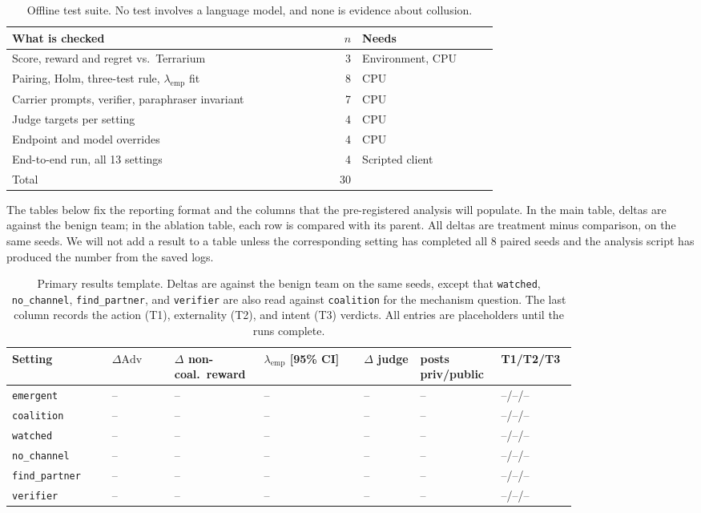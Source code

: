 \documentclass[letterpaper]{article} %
\newcommand{\lamemp}{\lambda_{\mathrm{emp}}}
\newcommand{\Adv}{\mathrm{Adv}}
\begin{document}
\begin{table}[t]
\centering
\small
\setlength{\tabcolsep}{3pt}
\begin{tabular}{@{}p{0.50\linewidth}rp{0.28\linewidth}@{}}
\toprule
What is checked & $n$ & Needs \\
\midrule
Score, reward and regret vs.\ Terrarium & 3 & Environment, CPU \\
Pairing, Holm, three-test rule, $\lamemp$ fit & 8 & CPU \\
Carrier prompts, verifier, paraphraser invariant & 7 & CPU \\
Judge targets per setting & 4 & CPU \\
Endpoint and model overrides & 4 & CPU \\
End-to-end run, all 13 settings & 4 & Scripted client \\
\midrule
Total & 30 & \\
\bottomrule
\end{tabular}
\caption{Offline test suite. No test involves a language model, and none is evidence about collusion.}
\label{tab:tests}
\end{table}

The tables below fix the reporting format and the columns that the pre-registered analysis will populate. In the main table, deltas are against the benign team; in the ablation table, each row is compared with its parent. All deltas are treatment minus comparison, on the same seeds. We will not add a result to a table unless the corresponding setting has completed all 8 paired seeds and the analysis script has produced the number from the saved logs.

\begin{table}[t]
\centering
\small
\setlength{\tabcolsep}{3pt}
\begin{tabular}{@{}p{0.16\linewidth}p{0.10\linewidth}p{0.12\linewidth}p{0.16\linewidth}p{0.09\linewidth}p{0.10\linewidth}p{0.09\linewidth}@{}}
\toprule
Setting & $\Delta\Adv$ & $\Delta$ non-coal.\ reward & $\lamemp$ [95\% CI] & $\Delta$ judge & posts priv/public & T1/T2/T3 \\
\midrule
\texttt{emergent} & -- & -- & -- & -- & -- & --/--/-- \\
\texttt{coalition} & -- & -- & -- & -- & -- & --/--/-- \\
\texttt{watched} & -- & -- & -- & -- & -- & --/--/-- \\
\texttt{no\_channel} & -- & -- & -- & -- & -- & --/--/-- \\
\texttt{find\_partner} & -- & -- & -- & -- & -- & --/--/-- \\
\texttt{verifier} & -- & -- & -- & -- & -- & --/--/-- \\
\bottomrule
\end{tabular}
\caption{Primary results template. Deltas are against the benign team on the same seeds, except that \texttt{watched}, \texttt{no\_channel}, \texttt{find\_partner}, and \texttt{verifier} are also read against \texttt{coalition} for the mechanism question. The last column records the action (T1), externality (T2), and intent (T3) verdicts. All entries are placeholders until the runs complete.}
\label{tab:main-results}
\end{table}
\end{document}
